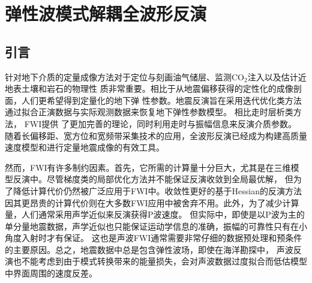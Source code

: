 



\chapter{弹性波模式解耦全波形反演}
\label{cha:MD-EFWI}
\section{引言}
针对地下介质的定量成像方法对于定位与刻画油气储层、监测CO$_2$注入以及估计近地表土壤和岩石的物理性
质非常重要。相比于从地震偏移获得的定性化的成像剖面，人们更希望得到定量化的地下弹
性参数。地震反演旨在采用迭代优化类方法通过拟合正演数据与实际观测数据来恢复地下弹性参数模型。
相比走时层析类方法，
FWI提供
了更加完善的理论，同时利用走时与振幅信息来反演介质参数\cite[]{tarantola:1986}。
随着长偏移距、宽方位和宽频带采集技术的应用，全波形反演已经成为构建高质量速度模型和进行定量地震成像的有效工具\cite{virieux2009overview}。

然而，FWI有许多制约因素。首先，它所需的计算量十分巨大，尤其是在三维模型反演中。尽管梯度类的局部优化方法并不能保证反演收敛到全局最优解，
但为了降低计算代价仍然被广泛应用于FWI中。收敛性更好的基于Hessian的反演方法\cite{mora:1987,crase1990robust}
因其更昂贵的计算代价则在大多数FWI应用中被舍弃不用。此外，为了减少计算量，人们通常采用声学近似来反演获得P波速度\cite{ravaut2004multiscale,operto2006crustal}。
但实际中，即使是以P波为主的单分量地震数据，声学近似也只能保证运动学信息的准确，振幅的可靠性只有在小角度入射时才有保证。
这也是声波FWI通常需要非常仔细的数据预处理和预条件的主要原因。总之，地震数据中总是包含弹性波场，即使在海洋勘探中，
声波反演也不能考虑到由于模式转换带来的能量损失，会对声波数据过度拟合而低估模型中界面周围的速度反差。

